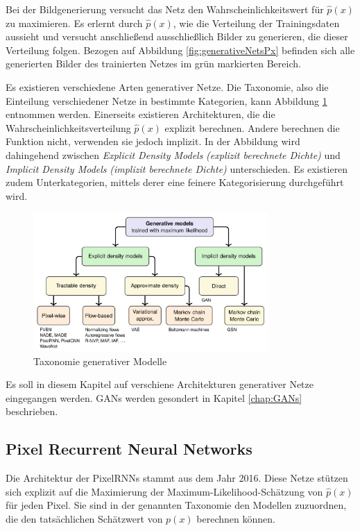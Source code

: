 Bei der Bildgenerierung versucht das Netz den Wahrscheinlichkeitswert für $\hat{p}(x)$ zu maximieren. Es erlernt durch $\hat{p}(x)$, wie die Verteilung der Trainingsdaten aussieht und versucht anschließend ausschließlich Bilder zu generieren, die dieser Verteilung folgen. Bezogen auf Abbildung \ref{fig:generativeNetsPx} befinden sich alle generierten Bilder des trainierten Netzes im grün markierten Bereich.

Es existieren verschiedene Arten generativer Netze. Die Taxonomie, also die Einteilung verschiedener Netze in bestimmte Kategorien, kann Abbildung \ref{fig:generativeModelsTaxonomy} entnommen werden. Einerseits existieren Architekturen, die die Wahrscheinlichkeitsverteilung $\hat{p}(x)$ explizit berechnen. Andere berechnen die Funktion nicht, verwenden sie jedoch implizit. In der Abbildung wird dahingehend zwischen \emph{Explicit Density Models} \emph{(explizit berechnete Dichte)} und \emph{Implicit Density Models} \emph{(implizit berechnete Dichte)} unterschieden. Es existieren zudem Unterkategorien, mittels derer eine feinere Kategorisierung durchgeführt wird.

\begin{figure}[H]
   \centering
   \includegraphics[width=0.8\textwidth]{images/Generative Networks/Taxonomy of Generative Models.png}
   \caption{Taxonomie generativer Modelle \cite{generativeModelsBook}}
   \label{fig:generativeModelsTaxonomy}
\end{figure}

Es soll in diesem Kapitel auf verschiene Architekturen generativer Netze eingegangen werden. \acp{GAN} werden gesondert in Kapitel \ref{chap:GANs} beschrieben.

\subsection{Pixel Recurrent Neural Networks}
Die Architektur der \acp{PixelRNN} stammt aus dem Jahr 2016. Diese Netze stützen sich explizit auf die Maximierung der Maximum-Likelihood-Schätzung von $\hat{p}(x)$ für jeden Pixel. Sie sind in der genannten Taxonomie den Modellen zuzuordnen, die den tatsächlichen Schätzwert von $p(x)$ berechnen können. \cite{pixelRNN}

